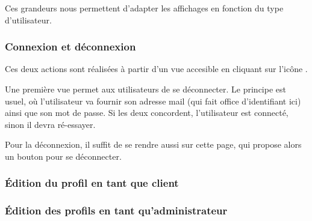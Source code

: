 Ces grandeurs nous permettent d'adapter les affichages en fonction du type d'utilisateur.

\subsubsection{Connexion et déconnexion}
Ces deux actions sont réalisées à partir d'un vue accesible en cliquant sur l'icône \thColor{\faUser}.

Une première vue permet aux utilisateurs de se déconnecter. Le principe est usuel, où l'utilisateur va fournir son adresse mail (qui fait office d'identifiant ici) ainsi que son mot de passe. Si les deux concordent, l'utilisateur est connecté, sinon il devra ré-essayer.

Pour la déconnexion, il suffit de se rendre aussi sur cette page, qui propose alors un bouton pour se déconnecter.

\subsubsection{\'Edition du profil en tant que client}

\subsubsection{\'Edition des profils en tant qu'administrateur}


